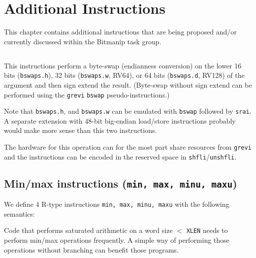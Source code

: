 \chapter{Additional Instructions}

This chapter contains additional instructions that are being proposed and/or
currently discussed within the Bitmanip task group.


\section{}

This instructions perform a byte-swap (endianness conversion) on the lower 16 bits
(\texttt{bswaps.h}), 32 bits (\texttt{bswaps.w}, RV64), or 64 bits (\texttt{bswaps.d}, RV128)
of the argument and then sign extend the result. (Byte-swap without sign extend can be
performed using the \texttt{grevi} \texttt{bswap} pseudo-instructions.)

Note that \texttt{bswaps.h}, and \texttt{bswaps.w} can be emulated with
\texttt{bswap} followed by \texttt{srai}. A separate extension with 48-bit big-endian
load/store instructions probably would make more sense than this two instructions.



The hardware for this operation can for the most part share resources from
\texttt{grevi} and the instructions can be encoded in the reserved space in \texttt{shfli}/\texttt{unshfli}.




\section{Min/max instructions (\texttt{min, max, minu, maxu})}

We define 4 R-type instructions \texttt{min, max, minu, maxu} with the
following semantics:



Code that performs saturated arithmetic on a word size $<$ \texttt{XLEN} needs to perform
min/max operations frequently. A simple way of performing those operations without branching
can benefit those programs.

